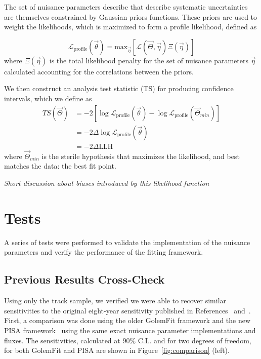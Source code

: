 \documentclass[main.tex]{subfiles}
\begin{document}
The set of nuisance parameters describe that describe systematic uncertainties are themselves constrained by Gaussian priors functions. 
These priors are used to weight the likelihoods, which is maximized to form a profile likelihood, defined as 

\begin{equation}
\mathcal{L}_{\text{profile}}\left(\vec{\theta}\right) = \text{max}_{\vec{\eta}}\left[\mathcal{L}(\vec{\Theta}, \vec{\eta}) \Xi(\vec{\eta}) \right]
\end{equation}
where $\Xi(\vec{\eta})$ is the total likelihood penalty for the set of nuisance parameters $\vec{\eta}$ calculated accounting for the correlations between the priors. 

We then construct an analysis test statistic (TS) for producing confidence intervals, which we define as 
\begin{equation}\begin{split}
TS(\vec{\Theta}) &= -2\left[ \log\mathcal{L}_{\text{profile}}(\vec{\theta}) - \log\mathcal{L}_{\text{profile}}(\vec{\Theta}_{min}) \right] \\
&= -2 \Delta \log\mathcal{L}_{\text{profile}}(\vec{\theta})\\
&=-2\Delta \text{LLH}
\end{split}\end{equation}
where $\vec{\Theta}_{min}$ is the sterile hypothesis that maximizes the likelihood, and best matches the data: the best fit point. 

\textit{Short discussion about biases introduced by this likelihood function}

\section{Tests}

A series of tests were performed to validate the implementation of the nuisance parameters and verify the performance of the fitting framework. 

\subsection{Previous Results Cross-Check}

Using only the track sample, we verified we were able to recover similar sensitivities to the original eight-year sensitivity published in References~\cite{Aartsen_2020} and~\cite{Aartsen_2020_prd}. 
First, a comparison was done using the older GolemFit framework and the new PISA framework~\cite{pisa} using the same exact nuisance parameter implementations and fluxes. 
The sensitivities, calculated at 90\% C.L. and for two degrees of freedom, for both GolemFit and PISA are shown in Figure~\ref{fig:comparison} (left).
\end{document}
